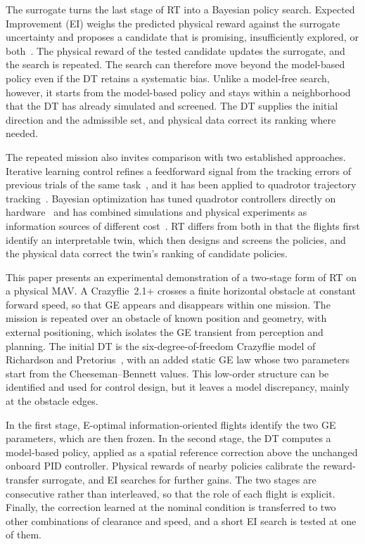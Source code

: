 \documentclass[journal]{IEEEtran}
\begin{document}
The surrogate turns the last stage of RT into a Bayesian policy search. Expected Improvement (EI) weighs the predicted physical reward against the surrogate uncertainty and proposes a candidate that is promising, insufficiently explored, or both~\cite{Mockus1975,Jones1998}. The physical reward of the tested candidate updates the surrogate, and the search is repeated. The search can therefore move beyond the model-based policy even if the DT retains a systematic bias. Unlike a model-free search, however, it starts from the model-based policy and stays within a neighborhood that the DT has already simulated and screened. The DT supplies the initial direction and the admissible set, and physical data correct its ranking where needed.

The repeated mission also invites comparison with two established approaches. Iterative learning control refines a feedforward signal from the tracking errors of previous trials of the same task~\cite{Bristow2006}, and it has been applied to quadrotor trajectory tracking~\cite{Schoellig2012,Meraglia2021}. Bayesian optimization has tuned quadrotor controllers directly on hardware~\cite{Berkenkamp2016} and has combined simulations and physical experiments as information sources of different cost~\cite{Marco2017}. RT differs from both in that the flights first identify an interpretable twin, which then designs and screens the policies, and the physical data correct the twin's ranking of candidate policies.

This paper presents an experimental demonstration of a two-stage form of RT on a physical MAV. A Crazyflie~2.1+ crosses a finite horizontal obstacle at constant forward speed, so that GE appears and disappears within one mission. The mission is repeated over an obstacle of known position and geometry, with external positioning, which isolates the GE transient from perception and planning. The initial DT is the six-degree-of-freedom Crazyflie model of Richardson and Pretorius~\cite{Richardson2025}, with an added static GE law whose two parameters start from the Cheeseman--Bennett values. This low-order structure can be identified and used for control design, but it leaves a model discrepancy, mainly at the obstacle edges.

In the first stage, E-optimal information-oriented flights identify the two GE parameters, which are then frozen. In the second stage, the DT computes a model-based policy, applied as a spatial reference correction above the unchanged onboard PID controller. Physical rewards of nearby policies calibrate the reward-transfer surrogate, and EI searches for further gains. The two stages are consecutive rather than interleaved, so that the role of each flight is explicit. Finally, the correction learned at the nominal condition is transferred to two other combinations of clearance and speed, and a short EI search is tested at one of them.
\end{document}

